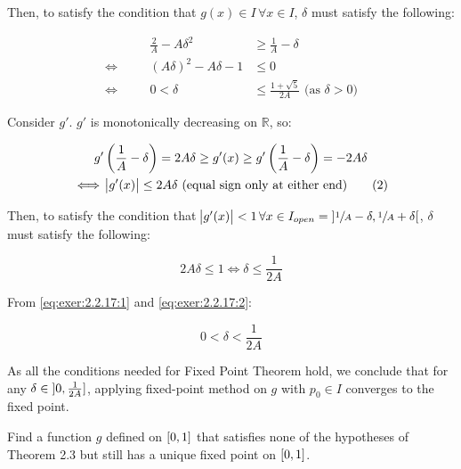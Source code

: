 \documentclass[../../../../Assignments]{subfiles}
\begin{document}
\begin{solution}
\begin{enumerate}[label = \alph*)]
            Then, to satisfy the condition that \(g(x) \in I \, \forall x \in
            I\), \(\delta\) must satisfy the following:

            \begin{align*}
                &\quad&   \frac{2}{A} - A \delta^2 &\geq \frac{1}{A} - \delta \\
                \iff&& (A \delta)^2 - A \delta - 1 &\leq 0 \\
                \iff&&                  0 < \delta &\leq \frac{1 + \sqrt{5}}{2A} \text{ (as \(\delta > 0\))} \tag{1}\label{eq:exer:2.2.17:1}
            \end{align*}

            Consider \(g'\). \(g'\) is monotonically decreasing on \(\mathbb{R}\), so:

            \begin{gather*}
                g' \left(\frac{1}{A} - \delta\right) = 2 A \delta \geq g'(x) \geq g' \left(\frac{1}{A} - \delta\right) = -2 A \delta \\
                \iff \abs{g'(x)} \leq 2 A \delta \text{ (equal sign only at either end)} \tag{2}\label{eq:exer:2.2.17:2}
            \end{gather*}

            Then, to satisfy the condition that \(\abs{g'(x)} < 1 \, \forall x
            \in I_{open} = \interval[open]{\sfrac{1}{A} - \delta}{\sfrac{1}{A} +
            \delta}\), \(\delta\) must satisfy the following:

            \[2 A \delta \leq 1 \iff \delta \leq \frac{1}{2A}\]

            From \eqref{eq:exer:2.2.17:1} and \eqref{eq:exer:2.2.17:2}:

            \[0 < \delta < \frac{1}{2A}\]

            As all the conditions needed for Fixed Point Theorem hold, we
            conclude that for any \(\delta \in \interval[open
            left]{0}{\frac{1}{2A}}\), applying fixed-point method on \(g\) with
            \(p_0 \in I\) converges to the fixed point.
    \end{enumerate}
\end{solution}

\begin{exercise}
    Find a function \(g\) defined on \(\interval{0}{1}\) that satisfies none of
    the hypotheses of Theorem 2.3 but still has a unique fixed point on
    \(\interval{0}{1}\).
\end{exercise}
\end{document}
